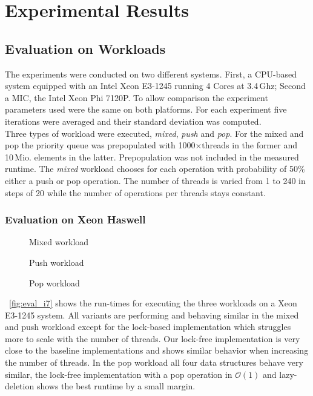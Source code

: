 \section{Experimental Results}
\label{sec:exp}
\subsection{Evaluation on Workloads}
The experiments were conducted on two different systems. First, a CPU-based system equipped with an Intel Xeon E3-1245 running 4 Cores at 3.4\,Ghz; Second a MIC, the Intel Xeon Phi 7120P. To allow comparison the experiment parameters used were the same on both platforms. For each experiment five iterations were averaged and their standard deviation was computed.\\
Three types of workload were executed, \textit{mixed}, \textit{push} and \textit{pop}. For the mixed and pop the priority queue was prepopulated with 1000$\times$threads in the former and 10\,Mio. elements in the latter. Prepopulation was not included in the measured runtime. The \textit{mixed} workload chooses for each operation with probability of 50\% either a push or pop operation. The number of threads is varied from 1 to 240 in steps of 20 while the number of operations per threads stays constant.

\subsubsection{Evaluation on Xeon Haswell}
\begin{figure*}[t]
	\centering
	\begin{subfigure}[b]{0.3\textwidth}
		\centering
		
		\caption{Mixed workload}
		\label{fig:xeon_mixed}
	\end{subfigure}
	\hfill
	\begin{subfigure}[b]{0.3\textwidth}
		\centering
		
		\caption{Push workload}
		\label{fig:xeon_push}
	\end{subfigure}
	\hfill
	\begin{subfigure}[b]{0.3\textwidth}
		\centering
		
		\caption{Pop workload}
		\label{fig:xeon_pop}
	\end{subfigure}
	\caption{Runtime for different workloads executed on a Xeon E3-1245 while varying the number of threads}
	\label{fig:eval_i7}
\end{figure*}
\figurename~\ref{fig:eval_i7} shows the run-times for executing the three workloads on a Xeon E3-1245 system. All variants are performing and behaving similar in the mixed and push workload except for the lock-based implementation which struggles more to scale with the number of threads. Our lock-free implementation is very close to the baseline implementations and shows similar behavior when increasing the number of threads. In the pop workload all four data structures behave very similar, the lock-free implementation with a pop operation in $\mathcal{O}(1)$ and lazy-deletion shows the best runtime by a small margin.


